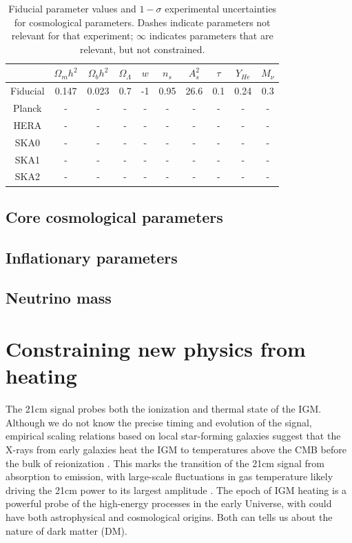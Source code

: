 \documentclass{PoS}
\begin{document}
\begin{table}[htdp]
\caption{Fiducial parameter values and $1-\sigma$ experimental uncertainties for cosmological parameters.  Dashes indicate parameters not relevant for that experiment; $\infty$ indicates parameters that are relevant, but not constrained. }
\begin{center}
\begin{tabular}{c|cccccccc|c}
\hline
& $\Omega_mh^2$ & $\Omega_bh^2$ & $\Omega_\Lambda$ & $w$ & $n_s$ & $A^2_s$ & $\tau$ & $Y_{He}$  & $M_\nu$ \\
\hline
Fiducial& 0.147 & 0.023 & 0.7 & -1 & 0.95 & 26.6 & 0.1 & 0.24 & 0.3  \\
\hline
Planck & - & - & - & - & - & - & - & - & -   \\
HERA & - & - & - & - & - & - & - & - & -  \\
SKA0 & - & - & - & - & - & - & - & - & -  \\
SKA1 & - & - & - & - & - & - & - & - & -  \\
SKA2 & - & - & - & - & - & - & - & - & -  \\
\end{tabular}
\end{center}
\label{tab:constraints}
\end{table}

\subsection{Core cosmological parameters}

\subsection{Inflationary parameters}

\subsection{Neutrino mass}



\section{Constraining new physics from heating}

The 21cm signal probes both the ionization and thermal state of the IGM.  Although we do not know the precise timing and evolution of the signal, empirical scaling relations based on local star-forming galaxies \cite[e.g.][]{2012MNRAS.419.2095M} suggest that the X-rays from early galaxies heat the IGM to temperatures above the CMB before the bulk of reionization \cite[e.g.][]{2006MNRAS.371..867F,2012ApJ...760....3M}.  This marks the transition of the 21cm signal from absorption to emission, with large-scale fluctuations in gas temperature likely driving the 21cm power to its largest amplitude \cite[e.g.][]{2007MNRAS.376.1680P,2010A&A...523A...4B}.  The epoch of IGM heating is a powerful probe of the high-energy processes in the early Universe, with could have both astrophysical and cosmological origins.  Both can tells us about the nature of dark matter (DM).
\end{document}

